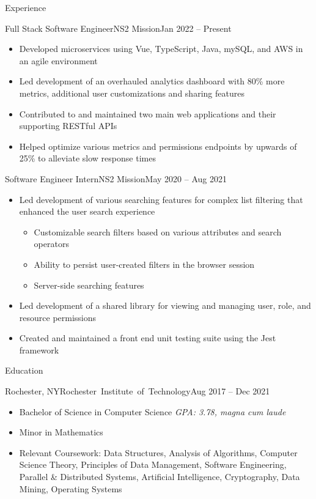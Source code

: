 \documentclass[]{mcdowellcv}
\begin{document}
	\makeheader
	
	\begin{cvsection}{Experience}
		\begin{cvsubsection}{Full Stack Software Engineer}{NS2 Mission}{Jan 2022 -- Present}	
			\begin{itemize}
				\item Developed microservices using Vue, TypeScript, Java, mySQL, and AWS in an agile environment
				\item Led development of an overhauled analytics dashboard with 80\% more metrics, additional user customizations and sharing features
				\item Contributed to and maintained two main web applications and their supporting RESTful APIs
				\item Helped optimize various metrics and permissions endpoints by upwards of 25\% to alleviate slow response times
			\end{itemize}
		\end{cvsubsection}

		\begin{cvsubsection}{Software Engineer Intern}{NS2 Mission}{May 2020 -- Aug 2021}	
			\begin{itemize}
				\item Led development of various searching features for complex list filtering that enhanced the user search experience
				\begin{itemize}
					\item Customizable search filters based on various attributes and search operators
					\item Ability to persist user-created filters in the browser session
					\item Server-side searching features
				\end{itemize}
				\item Led development of a shared library for viewing and managing user, role, and resource permissions
				\item Created and maintained a front end unit testing suite using the Jest framework
			\end{itemize}
		\end{cvsubsection}
	\end{cvsection}
	
	\begin{cvsection}{Education}
		\begin{cvsubsection}{Rochester, NY}{\mbox{Rochester Institute of Technology}}{Aug 2017 -- Dec 2021}
			\begin{itemize}
				\item Bachelor of Science in Computer Science \hfill \textit{GPA: 3.78, magna cum laude}
				\item Minor in Mathematics
				\item Relevant Coursework: Data Structures, Analysis of Algorithms, Computer Science Theory, Principles of Data Management, Software Engineering, Parallel \& Distributed Systems, Artificial Intelligence, 
				Cryptography, Data Mining, Operating Systems
			\end{itemize}
		\end{cvsubsection}
	\end{cvsection}
\end{document}
